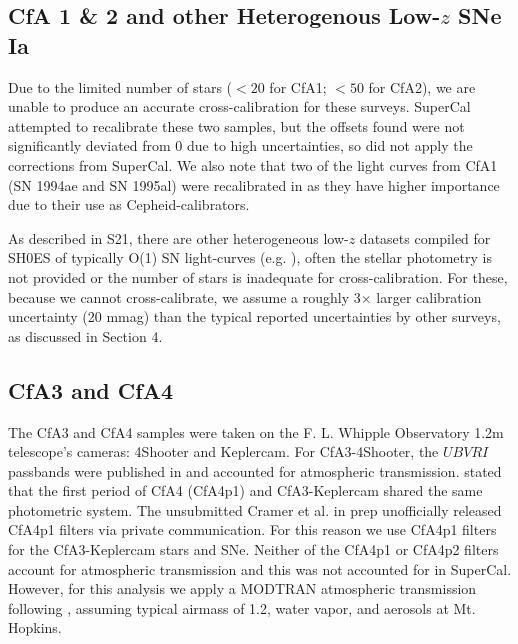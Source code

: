 \documentclass[twocolumn]{aastex63}
\newcommand{\blue}{\color{black}}
\newcommand{\red}{\color{black}}
\begin{document}
\subsection{CfA 1 \& 2 and other Heterogenous Low-$z$ SNe Ia}
Due to the limited number of stars ($<20$ for CfA1; $<50$ for CfA2), we are unable to produce an accurate cross-calibration for these surveys.  SuperCal attempted to recalibrate these two samples, but the offsets found were not significantly deviated from 0 due to high uncertainties, so \cite{Scolnic18} did not apply the corrections from SuperCal.  We also note that two of the light curves from CfA1 (SN 1994ae and SN 1995al) were recalibrated in \cite{riess05,riess09} as they have higher importance due to their use as Cepheid-calibrators.

{\blue As described in S21, there are other heterogeneous low-$z$ datasets compiled for {\blue SH0ES} of typically O(1) SN light-curves (e.g. \citealp{Milne10,Kris2017,Stritzinger10,Tsvetkov10})}, often the stellar photometry is not provided or the number of stars is inadequate for cross-calibration. For these, because we cannot cross-calibrate, we assume a roughly 3$\times$ larger calibration uncertainty (20 mmag) than the typical reported uncertainties by other surveys, as discussed in Section 4.

\subsection{CfA3 and CfA4}
The CfA3 and CfA4 samples were taken on the F. L. Whipple Observatory 1.2m telescope's cameras: 4Shooter and Keplercam. For CfA3-4Shooter, the $UBVRI$ passbands were published in \cite{Hicken09b} and accounted for atmospheric transmission. \cite{Hicken12} stated that the first period of CfA4 (CfA4p1) and CfA3-Keplercam shared the same photometric system. The unsubmitted Cramer et al. in prep unofficially released CfA4p1 filters via private communication.  For this reason we use CfA4p1 filters for the CfA3-Keplercam stars and SNe. Neither of the CfA4p1 or CfA4p2 filters account for atmospheric transmission and this was not accounted for in SuperCal. However, for this analysis we apply a MODTRAN atmospheric transmission following \cite{stubbsandtonry}, {\red assuming typical airmass of 1.2, water vapor, and aerosols at Mt. Hopkins.}
\end{document}
